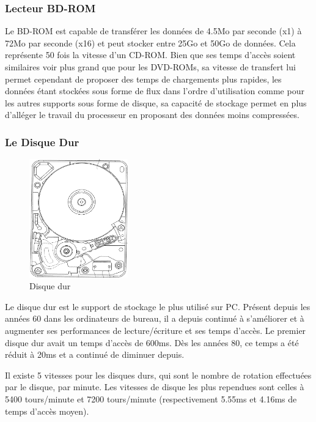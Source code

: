 \documentclass[a4paper, 11pt]{article} %
\begin{document}
\newpage
\subsubsection*{Lecteur BD-ROM}
Le BD-ROM est capable de transférer les données de 4.5Mo par seconde (x1) à 72Mo par seconde (x16)\cite{hardware:bdromspeed} et peut stocker entre 25Go et 50Go de données. Cela représente 50 fois la vitesse d'un CD-ROM. Bien que ses temps d'accès soient similaires voir plus grand que pour les DVD-ROMs, sa vitesse de transfert lui permet cependant de proposer des temps de chargements plus rapides, les données étant stockées sous forme de flux dans l'ordre d'utilisation comme pour les autres supports sous forme de disque, sa capacité de stockage permet en plus d’alléger le travail du processeur en proposant des données moins compressées.

\subsubsection*{Le Disque Dur}
\begin{figure}
\begin{center}
\includegraphics[width=0.38\textwidth]{images/hdd.png}
\end{center}
\caption{Disque dur}
\end{figure}
Le disque dur est le support de stockage le plus utilisé sur PC. Présent depuis les années 60 dans les ordinateurs de bureau, il a depuis continué à s'améliorer et à augmenter ses performances de lecture/écriture et ses temps d'accès. Le premier disque dur avait un temps d'accès de 600ms. Dès les années 80, ce temps a été réduit à 20ms et a continué de diminuer depuis.

Il existe 5 vitesses pour les disques durs, qui sont le nombre de rotation effectuées par le disque, par minute. Les vitesses de disque les plus rependues sont celles à 5400 tours/minute et 7200 tours/minute (respectivement 5.55ms et 4.16ms de temps d'accès moyen).\cite{hardware:hddspeed}
\end{document}
